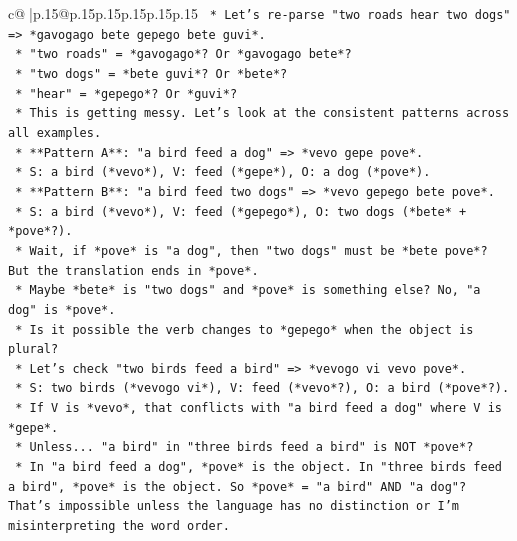 \documentclass{article}
\begin{document}
{\begin{supertabular}{c@{$\;$}|p{.15\linewidth}@{}p{.15\linewidth}p{.15\linewidth}p{.15\linewidth}p{.15\linewidth}p{.15\linewidth}}
{{{\texttt{                    *   Let's re{-}parse "two roads hear two dogs" => *gavogago bete gepego bete guvi*.} \\
\texttt{                        *   "two roads" = *gavogago*? Or *gavogago bete*?} \\
\texttt{                        *   "two dogs" = *bete guvi*? Or *bete*?} \\
\texttt{                        *   "hear" = *gepego*? Or *guvi*?} \\
\texttt{                    *   This is getting messy. Let's look at the consistent patterns across all examples.} \\
\texttt{                    *   **Pattern A**: "a bird feed a dog" => *vevo gepe pove*.} \\
\texttt{                        *   S: a bird (*vevo*), V: feed (*gepe*), O: a dog (*pove*).} \\
\texttt{                    *   **Pattern B**: "a bird feed two dogs" => *vevo gepego bete pove*.} \\
\texttt{                        *   S: a bird (*vevo*), V: feed (*gepego*), O: two dogs (*bete* + *pove*?).} \\
\texttt{                        *   Wait, if *pove* is "a dog", then "two dogs" must be *bete pove*? But the translation ends in *pove*.} \\
\texttt{                        *   Maybe *bete* is "two dogs" and *pove* is something else? No, "a dog" is *pove*.} \\
\texttt{                        *   Is it possible the verb changes to *gepego* when the object is plural?} \\
\texttt{                        *   Let's check "two birds feed a bird" => *vevogo vi vevo pove*.} \\
\texttt{                            *   S: two birds (*vevogo vi*), V: feed (*vevo*?), O: a bird (*pove*?).} \\
\texttt{                            *   If V is *vevo*, that conflicts with "a bird feed a dog" where V is *gepe*.} \\
\texttt{                            *   Unless... "a bird" in "three birds feed a bird" is NOT *pove*?} \\
\texttt{                            *   In "a bird feed a dog", *pove* is the object. In "three birds feed a bird", *pove* is the object. So *pove* = "a bird" AND "a dog"? That's impossible unless the language has no distinction or I'm misinterpreting the word order.} \\
}}}
\end{supertabular}}
\end{document}
